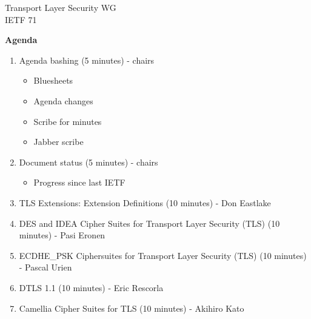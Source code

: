 \documentclass[helvetica]{seminar}
\newcommand{\heading}[1]{%
  \begin{center} 
    \large\bf 
    #1 
  \end{center} 
  \vspace{.4 in}}
\begin{document}
\begin{slide}
\begin{center}
\vspace{1 in}
\LARGE{{\bf}Transport Layer Security WG}\\
\large{{IETF 71}} \\
\end{center}
\end{slide}


\centerslidesfalse 

\begin{slide}
\heading{Agenda}

{\tiny
\begin{enumerate}
\item Agenda bashing (5 minutes) - chairs
\begin{itemize}
\item Bluesheets
\item Agenda changes
\item Scribe for minutes
\item Jabber scribe
\end{itemize}
\item Document status (5 minutes) - chairs
\begin{itemize}
\item Progress since last IETF
\end{itemize}      
\item TLS Extensions: Extension Definitions (10 minutes) - Don Eastlake 
\item DES and IDEA Cipher Suites for Transport Layer Security (TLS)  (10 minutes) - Pasi Eronen
\item ECDHE\_PSK Ciphersuites for Transport Layer Security (TLS) (10 minutes) - Pascal Urien
\item DTLS 1.1 (10 minutes) - Eric Rescorla
\item Camellia Cipher Suites for TLS (10 minutes) - Akihiro Kato
\end{enumerate}
}

\end{slide}
\end{document}
